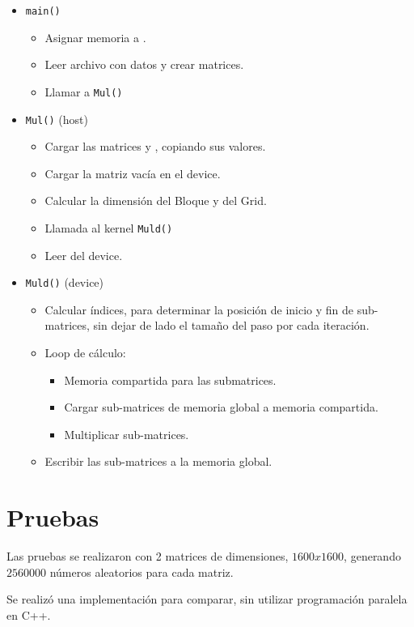 \begin{itemize}
	\item \texttt{main()}
	\begin{itemize}
		\item Asignar memoria a .
		\item Leer archivo con datos y crear matrices.
		\item Llamar a \texttt{Mul()}
	\end{itemize}
	\item \texttt{Mul()} (host)
	\begin{itemize}
		\item Cargar las matrices  y , copiando sus valores.
		\item Cargar la matriz vacía  en el device.
		\item Calcular la dimensión del Bloque y del Grid.
		\item Llamada al kernel \texttt{Muld()}
		\item Leer  del device.
	\end{itemize}
	\item \texttt{Muld()} (device)
	\begin{itemize}
		\item Calcular índices, para determinar la posición de inicio y fin de sub-matrices,
		sin dejar de lado el tamaño del paso por cada iteración.
		\item Loop de cálculo:
		 \begin{itemize}
		 	\item Memoria compartida para las submatrices.
			\item Cargar sub-matrices de memoria global a memoria compartida.
			\item Multiplicar sub-matrices.
		 \end{itemize}
		\item Escribir las sub-matrices a la memoria global.
	\end{itemize}
\end{itemize}

\section{Pruebas}

Las pruebas se realizaron con 2 matrices de dimensiones,
$1600x1600$, generando $2560000$ números aleatorios
para cada matriz.

Se realizó una implementación para comparar,
sin utilizar programación paralela en C++.

